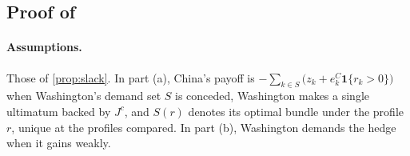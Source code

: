 \subsection{Proof of \texorpdfstring{}{counter-threats and hedges}}

\paragraph{Assumptions.} Those of \cref{prop:slack}. In part (a), China's payoff is $-\sum_{k\in S}\big(z_k+e^C_k\mathbf 1\{r_k>0\}\big)$ when Washington's demand set $S$ is conceded, Washington makes a single ultimatum backed by $J^c$, and $S(r)$ denotes its optimal bundle under the profile $r$, unique at the profiles compared. In part (b), Washington demands the hedge when it gains weakly.

